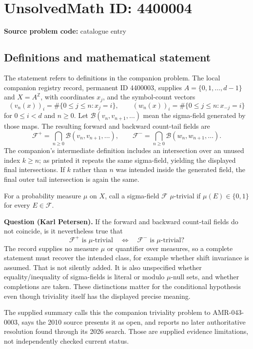 \documentclass[11pt]{article}
\newcommand{\Z}{\mathbb{Z}}
\begin{document}
\section*{UnsolvedMath ID: 4400004}
\textbf{Source problem code:} catalogue entry
\subsection{Definitions and mathematical statement}
The statement refers to definitions in the companion problem. The local companion registry record, permanent ID 4400003, supplies $A=\{0,1,\ldots,d-1\}$ and $X=A^{\Z}$, with coordinates $x_j$, and the symbol-count vectors
\[
 (v_n(x))_i=\#\{0\leq j\leq n:x_j=i\},\qquad
 (w_n(x))_i=\#\{0\leq j\leq n:x_{-j}=i\}
\]
for $0\leq i<d$ and $n\geq0$. Let $\mathcal B(v_n,v_{n+1},\ldots)$ mean the sigma-field generated by those maps. The resulting forward and backward count-tail fields are
\[
 \mathcal F^+=\bigcap_{n\geq0}\mathcal B(v_n,v_{n+1},\ldots),\qquad
 \mathcal F^-=\bigcap_{n\geq0}\mathcal B(w_n,w_{n+1},\ldots).
\]
The companion's intermediate definition includes an intersection over an unused index $k\geq n$; as printed it repeats the same sigma-field, yielding the displayed final intersections. If $k$ rather than $n$ was intended inside the generated field, the final outer tail intersection is again the same.

For a probability measure $\mu$ on $X$, call a sigma-field $\mathcal F$ $\mu$-trivial if $\mu(E)\in\{0,1\}$ for every $E\in\mathcal F$.

\textbf{Question (Karl Petersen).} If the forward and backward count-tail fields do not coincide, is it nevertheless true that
\[
 \mathcal F^+\text{ is $\mu$-trivial}
 \quad\Longleftrightarrow\quad
 \mathcal F^-\text{ is $\mu$-trivial}?
\]
The record supplies no measure $\mu$ or quantifier over measures, so a complete statement must recover the intended class, for example whether shift invariance is assumed. That is not silently added. It is also unspecified whether equality/inequality of sigma-fields is literal or modulo $\mu$-null sets, and whether completions are taken. These distinctions matter for the conditional hypothesis even though triviality itself has the displayed precise meaning.

The supplied summary calls this the companion triviality problem to AMR-043-0003, says the 2010 source presents it as open, and reports no later authoritative resolution found through its 2026 search. Those are supplied evidence limitations, not independently checked current status.
\end{document}
